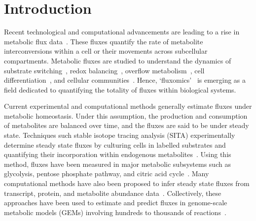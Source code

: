 \documentclass[12pt]{article}
\begin{document}
\clearpage

\section*{Introduction} %

Recent technological and computational advancements are leading to a rise in
metabolic flux
data~\citep{LeeWonDong2019Spas,WangLin2022Srit,WangRuohong2022Gstm}. These
fluxes quantify the rate of metabolite interconversions within a cell or their
movements across subcellular compartments. Metabolic fluxes are studied to
understand the dynamics of substrate
switching~\citep{ZampieriMattia2012Rmuc,KochanowskiKarl2021Gcom}, redox
balancing~\citep{McKinlayJamesB2010Cdfa,FranchinaDavideG2022Grbc}, overflow
metabolism~\citep{BasanMarkus2015OmiE,VanderHeidenMatthewG2009UtWE}, cell
differentiation~\citep{EndoYusuke2022Fami,BenjaminJacksonT2024Mrot}, and
cellular
communities~\citep{SchuetzRobert2012MOoM,YuJasonSL2022Mcfr,Gustafsson2024Mcbc}.
Hence, `fluxomics'~\citep{EmwasAbdul-Hamid2022F-NM,SanfordKarl2002Gtfa} is
emerging as a field dedicated to quantifying the totality of fluxes within
biological systems.

Current experimental and computational methods generally estimate fluxes
under metabolic homeostasis. Under this assumption, the production and
consumption of metabolites are balanced over time, and the fluxes are said
to be under steady state. Techniques such stable isotope tracing analysis
(SITA) experimentally determine steady state fluxes by culturing cells in
labelled substrates and quantifying their incorporation within endogenous
metabolites~\citep{BuescherJoergM2015Arfi,AntoniewiczMaciekR2018Agt1}.
Using this method, fluxes have been measured in major metabolic subsystems
such as glycolysis, pentose phosphate pathway, and citric acid
cycle~\citep{OrthJeffreyD2010RaUo,AhnEunyong2017Tfro,WuChao2019FARC}. Many
computational methods have also been proposed to infer steady state fluxes
from transcript, protein, and metabolite abundance
data~\citep{UematsuSaori2022Mlmf,GonzalezArrueNicolas2023Peom,HuangYuefan2023Ccmf,KasteJoshuaAM2023Afpu,LeeJustinY2023Tiac}.
Collectively, these approaches have been used to estimate and predict
fluxes in genome-scale metabolic models (GEMs) involving hundreds to
thousands of
reactions~\citep{NilssonAvlant2020Qaoa,CherkaouiSarah2022Afao,GelbachPatrickE2024Fsig}.
\end{document}
